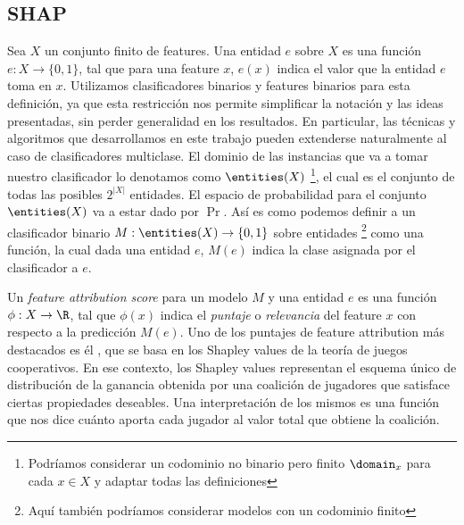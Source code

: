 \begin{comment}
	SHAP
	Complejidad de SHAP
	Resultados previos
	ASV + Grafo Causal y Toposorts
	Nuestro objetivo era calcular ASV en tiempo polinomial en Árboles de Decisión
\end{comment}

\subsection{SHAP}


Sea $X$ un conjunto finito de features. Una entidad $e$ sobre $X$ es una función $e: X \to \{0,1\}$, tal que para una feature $x$, $e(x)$ indica el valor que la entidad $e$ toma en $x$. Utilizamos clasificadores binarios y features binarios para esta definición, ya que esta restricción nos permite simplificar la notación y las ideas presentadas, sin perder generalidad en los resultados. En particular, las técnicas y algoritmos que desarrollamos en este trabajo pueden extenderse naturalmente al caso de clasificadores multiclase. El dominio de las instancias que va a tomar nuestro clasificador lo denotamos como $\entities(X)$ \footnote{Podríamos considerar un codominio no binario pero finito $\domain_x$ para cada $x \in X$ y adaptar todas las definiciones}, el cual es el conjunto de todas las posibles $2^{|X|}$ entidades. El espacio de probabilidad para el conjunto \(\entities(X)\) va a estar dado por \(\Pr\). Así es como podemos definir a un clasificador binario $M: \entities(X) \to \{0,1\}$ sobre entidades \footnote{Aquí también podríamos considerar modelos con un codominio finito} como una función, la cual dada una entidad $e$, $M(e)$ indica la clase asignada por el clasificador a $e$. %

Un \textit{feature attribution score} para un modelo $M$ y una entidad $e$ es una función $\phi : X \to \R$, tal que $\phi(x)$ indica el \textit{puntaje} o \textit{relevancia} del feature $x$ con respecto a la predicción $M(e)$. Uno de los puntajes de feature attribution más destacados es él \SHAPscore{} \cite{shapOriginalPaper}, que se basa en los Shapley values \cite{shapley1953value} de la teoría de juegos cooperativos. En ese contexto, los Shapley values representan el esquema único de distribución de la ganancia obtenida por una coalición de jugadores que satisface ciertas propiedades deseables. Una interpretación de los mismos es una función que nos dice cuánto aporta cada jugador al valor total que obtiene la coalición. %

